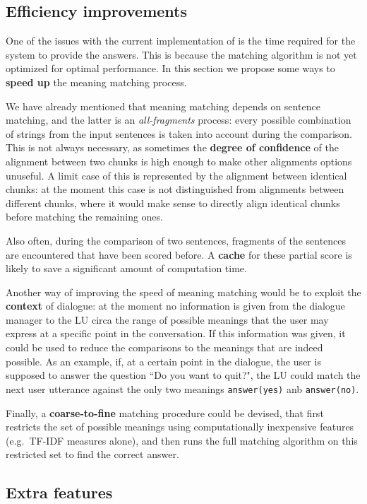 \subsection{Efficiency improvements}
One of the issues with the current implementation of \pname is the time required for the system to provide the answers. This is because the matching algorithm is not yet optimized for optimal performance. In this section we propose some ways to \textbf{speed up} the meaning matching process.

We have already mentioned that meaning matching depends on sentence matching, and the latter is an \textit{all-fragments} process: every possible combination of strings from the input sentences is taken into account during the comparison. This is not always necessary, as sometimes the \textbf{degree of confidence} of the alignment between two chunks is high enough to make other alignments options unuseful. A limit case of this is represented by the alignment between identical chunks: at the moment this case is not distinguished  from alignments between different chunks, where it would make sense to directly align identical chunks before matching the remaining ones.

Also often, during the comparison of two sentences, fragments of the sentences are encountered that have been scored before. A \textbf{cache} for these partial score is likely to save a significant amount of computation time.

Another way of improving the speed of meaning matching would be to exploit the \textbf{context} of dialogue: at the moment no information is given from the dialogue manager to the LU circa the range of possible meanings that the user may express at a specific point in the conversation. If this information was given, it could be used to reduce the comparisons to the meanings that are indeed possible. As an example, if, at a certain point in the dialogue, the user is supposed to answer the question ``Do you want to quit?", the LU could match the next user utterance against the only two meanings \texttt{answer(yes)} anb \texttt{answer(no)}.

Finally, a \textbf{coarse-to-fine} matching procedure could be devised, that first restricts the set of possible meanings using computationally inexpensive features (e.g.\ TF-IDF measures alone), and then runs the full matching algorithm on this restricted set to find the correct answer.

\subsection{Extra features}

